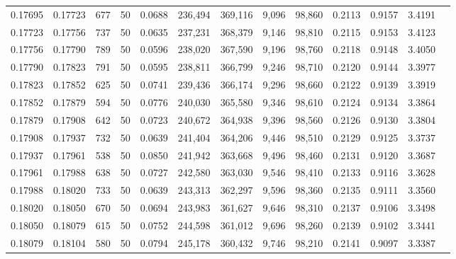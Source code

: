 \begin{tabular}{rrrrrrrrrrrrr}
0.17695 & 0.17723 &   677 &  50 &                                     0.0688 & 236,494 & 369,116 &   9,096 &  98,860 & 0.2113 & 0.9157 & 3.4191 \\
0.17723 & 0.17756 &   737 &  50 &                                     0.0635 & 237,231 & 368,379 &   9,146 &  98,810 & 0.2115 & 0.9153 & 3.4123 \\
0.17756 & 0.17790 &   789 &  50 &                                     0.0596 & 238,020 & 367,590 &   9,196 &  98,760 & 0.2118 & 0.9148 & 3.4050 \\
0.17790 & 0.17823 &   791 &  50 &                                     0.0595 & 238,811 & 366,799 &   9,246 &  98,710 & 0.2120 & 0.9144 & 3.3977 \\
0.17823 & 0.17852 &   625 &  50 &                                     0.0741 & 239,436 & 366,174 &   9,296 &  98,660 & 0.2122 & 0.9139 & 3.3919 \\
0.17852 & 0.17879 &   594 &  50 &                                     0.0776 & 240,030 & 365,580 &   9,346 &  98,610 & 0.2124 & 0.9134 & 3.3864 \\
0.17879 & 0.17908 &   642 &  50 &                                     0.0723 & 240,672 & 364,938 &   9,396 &  98,560 & 0.2126 & 0.9130 & 3.3804 \\
0.17908 & 0.17937 &   732 &  50 &                                     0.0639 & 241,404 & 364,206 &   9,446 &  98,510 & 0.2129 & 0.9125 & 3.3737 \\
0.17937 & 0.17961 &   538 &  50 &                                     0.0850 & 241,942 & 363,668 &   9,496 &  98,460 & 0.2131 & 0.9120 & 3.3687 \\
0.17961 & 0.17988 &   638 &  50 &                                     0.0727 & 242,580 & 363,030 &   9,546 &  98,410 & 0.2133 & 0.9116 & 3.3628 \\
0.17988 & 0.18020 &   733 &  50 &                                     0.0639 & 243,313 & 362,297 &   9,596 &  98,360 & 0.2135 & 0.9111 & 3.3560 \\
0.18020 & 0.18050 &   670 &  50 &                                     0.0694 & 243,983 & 361,627 &   9,646 &  98,310 & 0.2137 & 0.9106 & 3.3498 \\
0.18050 & 0.18079 &   615 &  50 &                                     0.0752 & 244,598 & 361,012 &   9,696 &  98,260 & 0.2139 & 0.9102 & 3.3441 \\
0.18079 & 0.18104 &   580 &  50 &                                     0.0794 & 245,178 & 360,432 &   9,746 &  98,210 & 0.2141 & 0.9097 & 3.3387 \\

\end{tabular}
